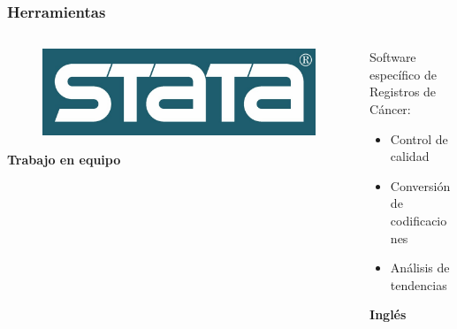 \documentclass{beamer}
\begin{document}

\begin{frame}\frametitle{Herramientas}
	
	\begin{columns}
		\begin{column}{0.4\textwidth}
			\begin{figure}
				\centering
				\includegraphics[width=.7\textwidth]{images/stata.jpg}
			\end{figure}
		
			\vspace{50pt}
			
			\centering
			\textbf{Trabajo en equipo}
			
		\end{column}
		\begin{column}{0.6\textwidth}
			\centering
			Software específico de Registros de Cáncer:\\

			\begin{itemize}
				\item 			\centering Control de calidad
				\item 			\centering Conversión de codificaciones
				\item 			\centering Análisis de tendencias
			\end{itemize}	
			\vspace{41pt}
			\centering
			\textbf{Inglés}
		\end{column}
	\end{columns}
	
\end{frame}
\end{document}
